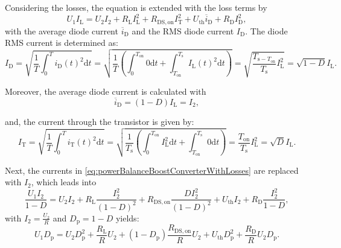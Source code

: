 \begin{solutionblock}
    Considering the losses, the equation is extended with the loss terms by
    \begin{equation}
        U_1 I_{\mathrm{L}} = U_2 I_2 + R_{\mathrm{L}} I_{\mathrm{L}}^2 + R_{\mathrm{DS,on}} I_{\mathrm{T}}^2 + U_{\mathrm{th}} \overline{i}_{\mathrm{D}} + R_{\mathrm{D}} I_{\mathrm{D}}^2,
        \label{eq:powerBalanceBoostConverterWithLosses}
    \end{equation}
    with the average diode current $\overline{i}_{\mathrm{D}}$ and the RMS diode current $I_{\mathrm{D}}$. The diode RMS current is determined as:
    \begin{equation}
        I_{\mathrm{D}} = \sqrt{\frac{1}{T} \int_{0}^{T} i_{\mathrm{D}}(t)^2 \mathrm{d}t}
        = \sqrt{\frac{1}{T} \left( \int_{0}^{T_{\mathrm{on}}} 0 \mathrm{d}t + \int_{T_{\mathrm{on}}}^{T_{\mathrm{s}}} I_{\mathrm{L}}(t)^2 \mathrm{d}t \right)}
        = \sqrt{\frac{T_{\mathrm{s}-T_{\mathrm{on}}}}{T_{\mathrm{s}}}I_{\mathrm{L}}^2}
        = \sqrt{1-D}I_{\mathrm{L}}.
    \end{equation}
    
    Moreover, the average diode current is calculated with
    \begin{equation}
        \overline{i}_{\mathrm{D}} = (1-D)I_{\mathrm{L}} = I_2,
        \label{eq:avgCurrentDiode}
    \end{equation}

    and, the current through the transistor is given by:
    \begin{equation}
        I_{\mathrm{T}} = \sqrt{\frac{1}{T} \int_{0}^{T} i_{\mathrm{T}}(t)^2 \mathrm{d}t}
        = \sqrt{\frac{1}{T_{\mathrm{s}}}\left(\int_{0}^{T_{\mathrm{on}}} I_{\mathrm{L}}^2 \mathrm{d} t + \int_{T_{\mathrm{on}}}^{T_{\mathrm{s}}} 0 \mathrm{d} t \right)}
        = \frac{T_{\mathrm{on}}}{T_{\mathrm{s}}}I_{\mathrm{L}}^2
        = \sqrt{D} I_{\mathrm{L}}.
    \end{equation}

    Next, the currents in \eqref{eq:powerBalanceBoostConverterWithLosses} are replaced with $I_{\mathrm{2}}$, which leads into
    \begin{equation}
        \frac{U_1 I_2}{1 -D} = U_2 I_2 + R_{\mathrm{L}}\frac{I_2^2}{\left(1-D\right)^2} + R_{\mathrm{DS,on}} \frac{D I_2^2}{\left(1-D\right)^2} + U_{\mathrm{th}}I_2 + R_{\mathrm{D}}\frac{I_2^2}{1-D},
    \end{equation}
    with $I_2 = \frac{U_2}{R}$ and $D_{\mathrm{p}} = 1-D$ yields:
    \begin{equation}
        U_1 D_{\mathrm{p}} = U_2 D_{\mathrm{p}}^2 + \frac{R_{\mathrm{L}}}{R} U_2 + (1-D_{\mathrm{p}}) \frac{R_{\mathrm{DS,on}}}{R}U_2 + U_{\mathrm{th}}D_{\mathrm{p}}^2 + \frac{R_{\mathrm{D}}}{R}U_2 D_{\mathrm{p}}.
    \end{equation}


\end{solutionblock}

